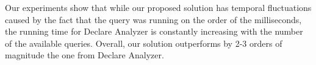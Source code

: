 Our experiments show that while our proposed solution has temporal fluctuations caused by the fact that the query was running on the order of the milliseconds, the running time for Declare Analyzer is constantly increasing with the number of the available queries. Overall, our solution outperforms by 2-3 orders of magnitude the one from Declare Analyzer.


%
%
%
